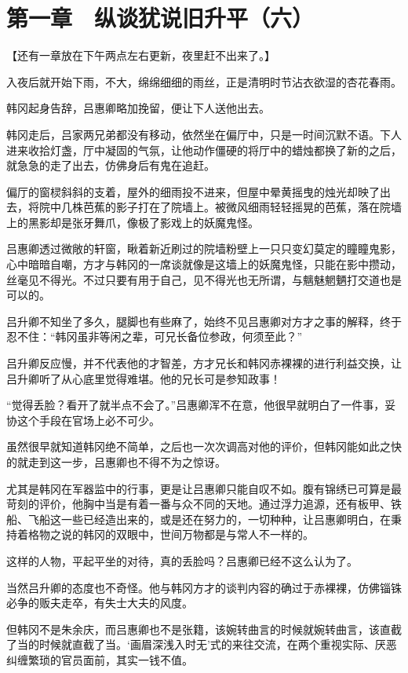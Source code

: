 \section{第一章　纵谈犹说旧升平（六）}

【还有一章放在下午两点左右更新，夜里赶不出来了。】

入夜后就开始下雨，不大，绵绵细细的雨丝，正是清明时节沾衣欲湿的杏花春雨。

韩冈起身告辞，吕惠卿略加挽留，便让下人送他出去。

韩冈走后，吕家两兄弟都没有移动，依然坐在偏厅中，只是一时间沉默不语。下人进来收拾灯盏，厅中凝固的气氛，让他动作僵硬的将厅中的蜡烛都换了新的之后，就急急的走了出去，仿佛身后有鬼在追赶。

偏厅的窗棂斜斜的支着，屋外的细雨投不进来，但屋中晕黄摇曳的烛光却映了出去，将院中几株芭蕉的影子打在了院墙上。被微风细雨轻轻摇晃的芭蕉，落在院墙上的黑影却是张牙舞爪，像极了影戏上的妖魔鬼怪。

吕惠卿透过微敞的轩窗，瞅着新近刷过的院墙粉壁上一只只变幻莫定的瞳瞳鬼影，心中暗暗自嘲，方才与韩冈的一席谈就像是这墙上的妖魔鬼怪，只能在影中攒动，丝毫见不得光。不过只要有用于自己，见不得光也无所谓，与魑魅魍魉打交道也是可以的。

吕升卿不知坐了多久，腿脚也有些麻了，始终不见吕惠卿对方才之事的解释，终于忍不住：“韩冈虽非等闲之辈，可兄长备位参政，何须至此？”

吕升卿反应慢，并不代表他的才智差，方才兄长和韩冈赤裸裸的进行利益交换，让吕升卿听了从心底里觉得难堪。他的兄长可是参知政事！

“觉得丢脸？看开了就半点不会了。”吕惠卿浑不在意，他很早就明白了一件事，妥协这个手段在官场上必不可少。

虽然很早就知道韩冈绝不简单，之后也一次次调高对他的评价，但韩冈能如此之快的就走到这一步，吕惠卿也不得不为之惊讶。

尤其是韩冈在军器监中的行事，更是让吕惠卿只能自叹不如。腹有锦绣已可算是最苛刻的评价，他胸中当是有着一番与众不同的天地。通过浮力追源，还有板甲、铁船、飞船这一些已经造出来的，或是还在努力的，一切种种，让吕惠卿明白，在秉持着格物之说的韩冈的双眼中，世间万物都是与常人不一样的。

这样的人物，平起平坐的对待，真的丢脸吗？吕惠卿已经不这么认为了。

当然吕升卿的态度也不奇怪。他与韩冈方才的谈判内容的确过于赤裸裸，仿佛锱铢必争的贩夫走卒，有失士大夫的风度。

但韩冈不是朱余庆，而吕惠卿也不是张籍，该婉转曲言的时候就婉转曲言，该直截了当的时候就直截了当。‘画眉深浅入时无’式的来往交流，在两个重视实际、厌恶纠缠繁琐的官员面前，其实一钱不值。


